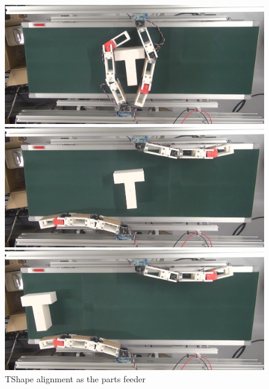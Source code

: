 \documentclass[a4paper,twoside,12pt,papersize, dvipdfmx]{iirthesis}
\begin{document}
\begin{figure}[hb]
\begin{minipage}{0.49\hsize}
\end{minipage}\hfill
\begin{minipage}{0.49\hsize}
\includegraphics[width=0.98\hsize]{fig/4-manipulation-result/TShape/3-4.jpg}
\subcaption{}
\end{minipage}\hfill
\begin{minipage}{0.49\hsize}
\includegraphics[width=0.98\hsize]{fig/4-manipulation-result/TShape/3-5.jpg}
\subcaption{}
\end{minipage}\hfill
\begin{minipage}{0.49\hsize}
\includegraphics[width=0.98\hsize]{fig/4-manipulation-result/TShape/3-6.jpg}
\subcaption{}
\end{minipage}\hfill
\caption{TShape alignment as the parts feeder}\label{fig::result::tp}
\end{figure}
\end{document}
